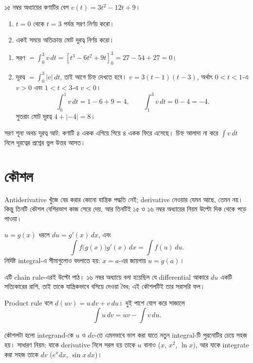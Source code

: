 \documentclass[11pt]{article}
\begin{document}
 ১৫ নম্বর অধ্যায়ের কণাটির বেগ $v(t) = 3t^{2} - 12t + 9$।
\begin{enumerate}
  \item $t = 0$ থেকে $t = 3$ পর্যন্ত সরণ নির্ণয় করো।
  \item একই সময়ে অতিক্রান্ত মোট দূরত্ব নির্ণয় করো।
\end{enumerate}

\begin{sol}
\begin{enumerate}
  \item সরণ $= \int_{0}^{3}v\,dt = \left[ t^{3}-6t^{2}+9t \right]_{0}^{3}
        = 27 - 54 + 27 = 0$।
  \item দূরত্ব $= \int_{0}^{3}|v|\,dt$, তাই আগে চিহ্ন দেখতে হবে।
        $v = 3(t-1)(t-3)$, অর্থাৎ $0<t<1$-এ $v>0$ এবং $1<t<3$-এ $v<0$।
        \[
          \int_{0}^{1}v\,dt = 1 - 6 + 9 = 4, \qquad
          \int_{1}^{3}v\,dt = 0 - 4 = -4 .
        \]
        সুতরাং মোট দূরত্ব $4 + |-4| = 8$।
\end{enumerate}
সরণ শূন্য অথচ দূরত্ব আট: কণাটি ৪ একক এগিয়ে গিয়ে ৪ একক ফিরে এসেছে। চিহ্ন
আলাদা না করে $\int v\,dt$ নিলে দূরত্বের প্রশ্নের ভুল উত্তর আসত।
\end{sol}

\section{কৌশল}

Antiderivative খুঁজে বের করার কোনো যান্ত্রিক পদ্ধতি নেই; derivative নেওয়ার
যেমন আছে, তেমন নয়। কিন্তু তিনটি কৌশল বেশিরভাগ কাজ সেরে দেয়, আর তিনটিই ১৫ ও
১৬ নম্বর অধ্যায়ের নিয়ম উল্টো দিক থেকে পড়ে পাওয়া।

\begin{idea}[প্রতিস্থাপন (Substitution)]
$u = g(x)$ ধরলে $du = g'(x)\,dx$, এবং
\[
  \int f\bigl( g(x) \bigr)g'(x)\,dx = \int f(u)\,du .
\]
নির্দিষ্ট integral-এ সীমাগুলোও বদলাতে হয়: $x = a$-এর জায়গায় $u = g(a)$।
\end{idea}

এটি chain rule-এরই উল্টো পাঠ। ১৬ নম্বর অধ্যায়ে বলা হয়েছিল যে differential
আকারে $du$ একটি সত্যিকারের রাশি, তাই তাকে যান্ত্রিকভাবে বসিয়ে দেওয়া বৈধ; এই
কৌশলটিই তার সরাসরি ফল।

\begin{idea}
Product rule বলে $d(uv) = u\,dv + v\,du$। দুই পাশে যোগ করে সাজালে
\[
  \int u\,dv = uv - \int v\,du .
\]
\end{idea}

কৌশলটা হলো integrand-কে $u$ ও $dv$-তে এমনভাবে ভাগ করা যাতে নতুন integral-টি
পুরনোটির চেয়ে সহজ হয়। সাধারণ নিয়ম: যাকে derivative নিলে সরল হয় তাকে $u$
বানাও ($x$, $x^{2}$, $\ln x$), আর যাকে integrate করা সহজ তাকে $dv$
($e^{x}dx$, $\sin x\,dx$)।
\end{document}
